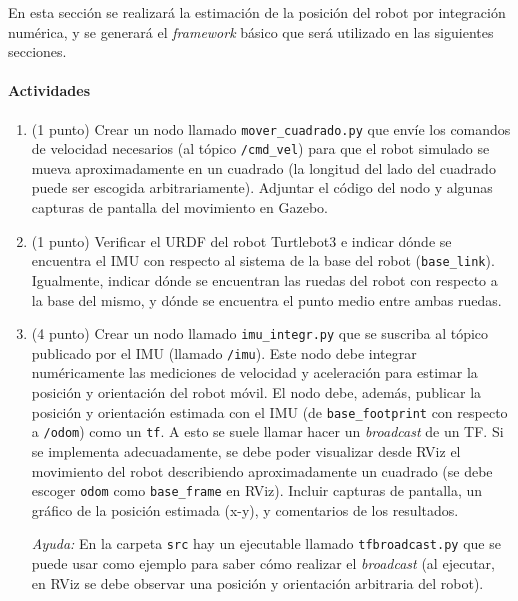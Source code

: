 \documentclass[a4paper,11pt]{robotlabs}
\begin{document}
En esta sección se realizará la estimación de la posición del robot por
integración numérica, y se generará el \textit{framework} básico que será
utilizado en las siguientes secciones.


\paragraph{Actividades} 

\begin{enumerate}

\item (1 punto) Crear un nodo llamado \texttt{mover\_cuadrado.py} que envíe los
  comandos de velocidad necesarios (al tópico \texttt{/cmd\_vel}) para que el
  robot simulado se mueva aproximadamente en un cuadrado (la longitud del lado
  del cuadrado puede ser escogida arbitrariamente). Adjuntar el código del nodo
  y algunas capturas de pantalla del movimiento en Gazebo.

\item (1 punto) Verificar el URDF del robot Turtlebot3 e indicar dónde se
  encuentra el IMU con respecto al sistema de la base del robot
  (\texttt{base\_link}). Igualmente, indicar dónde se encuentran las ruedas del
  robot con respecto a la base del mismo, y dónde se encuentra el punto medio
  entre ambas ruedas.
  
\item (4 punto) Crear un nodo llamado \texttt{imu\_integr.py} que se suscriba
  al tópico publicado por el IMU (llamado \texttt{/imu}). Este nodo debe
  integrar numéricamente las mediciones de velocidad y aceleración para estimar
  la posición y orientación del robot móvil. El nodo debe, además, publicar la
  posición y orientación estimada con el IMU (de \texttt{base\_footprint} con
  respecto a \texttt{/odom}) como un \texttt{tf}. A esto se suele llamar hacer
  un \textit{broadcast} de un TF. Si se implementa adecuadamente, se debe poder
  visualizar desde RViz el movimiento del robot describiendo aproximadamente un
  cuadrado (se debe escoger \texttt{odom} como \texttt{base\_frame} en
  RViz). Incluir capturas de pantalla, un gráfico de la posición estimada
  (x-y), y comentarios de los resultados.

  \textit{Ayuda:} En la carpeta \texttt{src} hay un ejecutable llamado
  \texttt{tfbroadcast.py} que se puede usar como ejemplo para saber cómo
  realizar el \textit{broadcast} (al ejecutar, en RViz se debe observar una
  posición y orientación arbitraria del robot).

\end{enumerate}  
\end{document}
